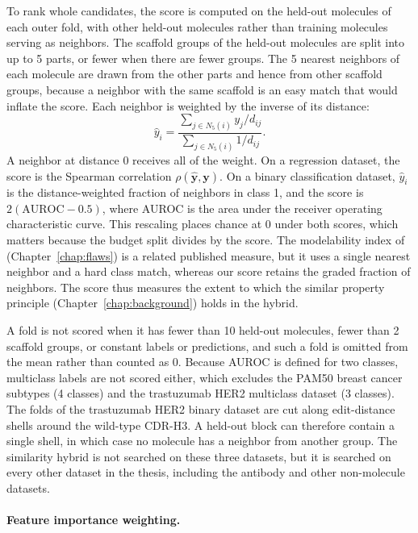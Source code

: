 To rank whole candidates, the score is computed on the held-out molecules of each outer fold, with other held-out molecules rather than training molecules serving as neighbors. The scaffold groups of the held-out molecules are split into up to 5 parts, or fewer when there are fewer groups. The 5 nearest neighbors of each molecule are drawn from the other parts and hence from other scaffold groups, because a neighbor with the same scaffold is an easy match that would inflate the score. Each neighbor is weighted by the inverse of its distance:
\begin{equation}
\hat{y}_i = \frac{\sum_{j\in N_5(i)} y_j / d_{ij}}{\sum_{j\in N_5(i)} 1/d_{ij}}.
\end{equation}
A neighbor at distance 0 receives all of the weight. On a regression dataset, the score is the Spearman correlation $\rho(\hat{\mathbf{y}}, \mathbf{y})$. On a binary classification dataset, $\hat{y}_i$ is the distance-weighted fraction of neighbors in class 1, and the score is $2(\mathrm{AUROC} - 0.5)$, where AUROC is the area under the receiver operating characteristic curve. This rescaling places chance at 0 under both scores, which matters because the budget split divides by the score. The modelability index of \citet{Golbraikh2014} (Chapter~\ref{chap:flaws}) is a related published measure, but it uses a single nearest neighbor and a hard class match, whereas our score retains the graded fraction of neighbors. The score thus measures the extent to which the similar property principle (Chapter~\ref{chap:background}) holds in the hybrid.

A fold is not scored when it has fewer than 10 held-out molecules, fewer than 2 scaffold groups, or constant labels or predictions, and such a fold is omitted from the mean rather than counted as 0. Because AUROC is defined for two classes, multiclass labels are not scored either, which excludes the PAM50 breast cancer subtypes (4 classes) and the trastuzumab HER2 multiclass dataset (3 classes). The folds of the trastuzumab HER2 binary dataset are cut along edit-distance shells around the wild-type CDR-H3. A held-out block can therefore contain a single shell, in which case no molecule has a neighbor from another group. The similarity hybrid is not searched on these three datasets, but it is searched on every other dataset in the thesis, including the antibody and other non-molecule datasets.


\paragraph{Feature importance weighting.}

